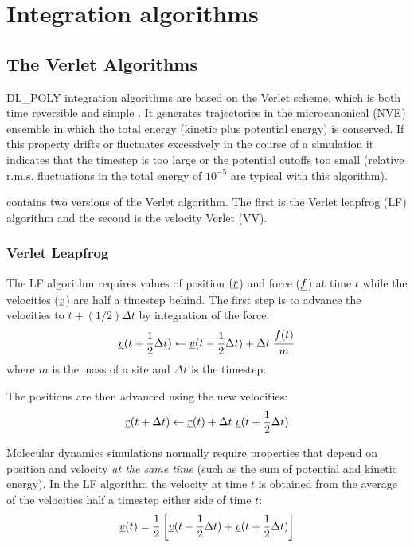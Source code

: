 
\section{Integration algorithms}
\label{integration}

\subsection{The Verlet Algorithms}

DL\_POLY integration algorithms are based on 
the Verlet
scheme, which is both time reversible and simple \cite{allen-89a}. 
It generates trajectories in the
microcanonical (NVE) ensemble in which the total energy (kinetic plus
potential energy) is conserved. If this property drifts or fluctuates
excessively in the course of a simulation it indicates that the
timestep is too large or the potential cutoffs too small (relative
r.m.s. fluctuations in the total energy of $10^{-5}$ are typical with
this algorithm).

\D{} contains two versions of the Verlet algorithm. The first is the Verlet
leapfrog (LF) algorithm and the second is
the velocity Verlet (VV). 

\subsubsection{Verlet Leapfrog}
The LF algorithm requires values of position $(\mbox{$\underline{r}$}$) and force
($\mbox{$\underline{f}$}$) at time $t$ while the velocities ($\mbox{$\underline{v}$}$) are half a
timestep behind. The first step is to advance the velocities to
$t+(1/2)\Delta t$ by integration of the force:
\begin{equation}
\mbox{$\underline{v}$}(t + {1\over 2} \Delta t) \leftarrow  \mbox{$\underline{v}$}(t-{1\over 2} \Delta t) + \Delta t \; {\mbox{$\underline{f}$}(t)\over m}
\end{equation}
where $m$ is the mass of a site and $\Delta t$ is the timestep.

The positions are then advanced using the new velocities:
\begin{equation}
\mbox{$\underline{r}$}(t+\Delta t) \leftarrow \mbox{$\underline{r}$}(t) + \Delta t \;\mbox{$\underline{v}$}(t+{1\over 2}\Delta t)
\end{equation}

Molecular dynamics simulations normally require properties that depend
on position and velocity {\em at the same time} (such as the sum of
potential and kinetic energy).  In the LF algorithm the velocity at
time $t$ is obtained from the average of the velocities half a
timestep either side of time $t$:
\begin{equation}
\mbox{$\underline{v}$}(t) = {1\over 2} \left[\mbox{$\underline{v}$}(t-{1\over 2}\Delta t) + \mbox{$\underline{v}$}(t+{1\over 2}\Delta t)\right]
\end{equation}

